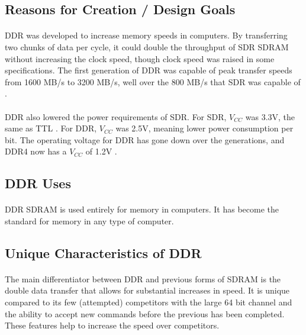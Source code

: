 \documentclass{article}
\begin{document}
	\subsection{Reasons for Creation / Design Goals}
	
	\paragraph{} DDR was developed to increase memory speeds in computers. By transferring two chunks of data per cycle, it could double the throughput of SDR SDRAM without increasing the clock speed, though clock speed was raised in some specifications. The first generation of DDR was capable of peak transfer speeds from 1600 MB/s to 3200 MB/s, well over the 800 MB/s that SDR was capable of \cite{ddrspec}.
	
	\paragraph{} DDR also lowered the power requirements of SDR. For SDR, $V_{CC}$ was 3.3V, the same as TTL \cite{sdrdata}. For DDR, $V_{CC}$ was 2.5V, meaning lower power consumption per bit. The operating voltage for DDR has gone down over the generations, and DDR4 now has a $V_{CC}$ of 1.2V \cite{ddr4}.
	
	\subsection{DDR Uses}
	
	\paragraph{} DDR SDRAM is used entirely for memory in computers. It has become the standard for memory in any type of computer.
	
	\subsection{Unique Characteristics of DDR}
	
	\paragraph{} The main differentiator between DDR and previous forms of SDRAM is the double data transfer that allows for substantial increases in speed. It is unique compared to its few (attempted) competitors with the large 64 bit channel and the ability to accept new commands before the previous has been completed. These features help to increase the speed over competitors.
	
\end{document}
